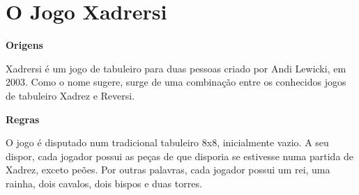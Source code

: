 \documentclass[a4paper]{article}
\begin{document}

\newpage

%
%
%
%
%
%
%


\section{O Jogo Xadrersi}

\textbf{Origens}\linebreak

Xadrersi é um jogo de tabuleiro para duas pessoas criado por Andi Lewicki, em 2003. Como o nome sugere, surge de uma combinação entre os conhecidos jogos de tabuleiro Xadrez e Reversi.\newline

\textbf{Regras}\newline

O jogo é disputado num tradicional tabuleiro 8x8, inicialmente vazio. A seu dispor, cada jogador possui as peças de que disporia se estivesse numa partida de Xadrez, exceto peões.
Por outras palavras, cada jogador possui um rei, uma rainha, dois cavalos, dois bispos e duas torres.\newline
\end{document}

